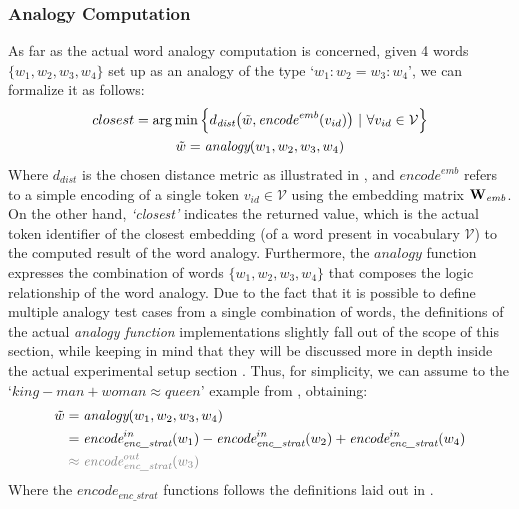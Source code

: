 \subsubsection{Analogy Computation}

As far as the actual word analogy computation is concerned, given 4 words $\{w_1, w_2, w_3, w_4\}$ set up as an analogy of the type `$w_1 : w_2 = w_3 : w_4$', we can formalize it as follows:
\begin{equation}
    \label{eq:method_embeddings_analogy}
    \begin{gathered}
        closest = \arg\min {\Bigl\{ d_{\textit{dist}}\bigl(\tilde w, \textit{encode}^{\textit{emb}}(v_{id})\bigr) \ |\ \forall v_{id} \in \mathcal{V} \Bigr\}} \\
        \tilde w = \textit{analogy}(w_1, w_2, w_3, w_4)
    \end{gathered}
\end{equation}
Where $d_{\textit{dist}}$ is the chosen distance metric as illustrated in , and $\textit{encode}^{\textit{emb}}$ refers to a simple encoding of a single token $v_{id} \in \mathcal{V}$ using the embedding matrix $\bm{\mathbf{W}}_{\textit{emb}}$.
On the other hand, \emph{`closest'} indicates the returned value, which is the actual token identifier of the closest embedding (of a word present in vocabulary $\mathcal{V}$) to the computed result of the word analogy.
Furthermore, the $\textit{analogy}$ function expresses the combination of words $\{w_1, w_2, w_3, w_4\}$ that composes the logic relationship of the word analogy.
Due to the fact that it is possible to define multiple analogy test cases from a single combination of words, the definitions of the actual \emph{analogy function} implementations slightly fall out of the scope of this section, while keeping in mind that they will be discussed more in depth inside the actual experimental setup section .
Thus, for simplicity, we can assume to  the  `$king - man + woman \approx queen$' example from \citet{mikolov2013}, obtaining:
\begin{equation}
    \label{eq:method_embeddings_analogy-function}
    \begin{aligned}
        \tilde w &= \textit{analogy}(w_1, w_2, w_3, w_4) \\
        &= {\textit{encode}}_{\textit{enc\_strat}}^{in}(w_1) - {\textit{encode}}_{\textit{enc\_strat}}^{in}(w_2) + {\textit{encode}}_{\textit{enc\_strat}}^{in}(w_4) \\
        &\color{gray} \approx {\textit{encode}}_{\textit{enc\_strat}}^{out}(w_3) 
    \end{aligned}
\end{equation}
Where the ${\textit{encode}}_{\textit{enc\_strat}}$ functions follows the definitions laid out in .

